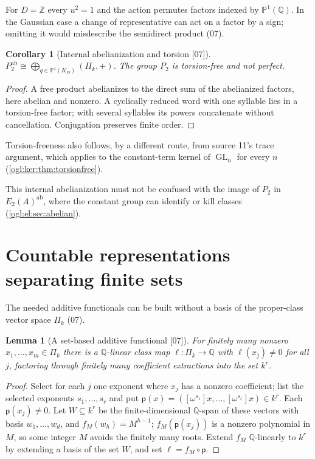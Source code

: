 \documentclass[11pt,oneside]{article}
\numberwithin{equation}{section}
\newtheorem{lemma}[lemma]{Lemma}
\newtheorem{corollary}[corollary]{Corollary}
\theoremstyle{definition}
\theoremstyle{remark}
\newcommand{\Z}{\mathbb Z}
\newcommand{\Q}{\mathbb Q}
\newcommand{\PP}{\mathbb P}
\newcommand{\GL}{\operatorname{GL}}
\newcommand{\ab}{\mathrm{ab}}
\newcommand{\coeff}[2]{[\omega^{#1}]#2}
\newcommand{\src}[1]{\textup{\textsf{\small[#1]}}}
\begin{document}
For $D=\Z$ every $u^2=1$ and the action permutes factors indexed by
$\PP^1(\Q)$. In the Gaussian case a change of representative can act on a
factor by a sign; omitting it would misdescribe the semidirect product (07).

\begin{corollary}[Internal abelianization and torsion \src{07}]\label{ogl:el:cor:kernelab}
$P_2^{\ab}\cong\bigoplus_{q\in\PP^1(K_D)}(\Pi_k,+)$. The group $P_2$ is
torsion-free and not perfect.
\end{corollary}
\begin{proof}
A free product abelianizes to the direct sum of the abelianized factors, here
abelian and nonzero. A cyclically reduced word with one syllable lies in a
torsion-free factor; with several syllables its powers concatenate without
cancellation. Conjugation preserves finite order.
\end{proof}

Torsion-freeness also follows, by a different route, from source 11's trace
argument, which applies to the constant-term kernel of $\GL_n$ for every $n$
(\cref{ogl:ker:thm:torsionfree}).

This internal abelianization must not be confused with the image of $P_2$ in
$E_2(A)^{\ab}$, where the constant group can identify or kill classes
(\cref{ogl:el:sec:abelian}).

\section{Countable representations separating finite sets}\label{ogl:el:sec:countable}

The needed additive functionals can be built without a basis of the
proper-class vector space $\Pi_k$ (07).

\begin{lemma}[A set-based additive functional \src{07}]\label{ogl:el:lem:functional}
For finitely many nonzero $x_1,\dots,x_m\in\Pi_k$ there is a $\Q$-linear class
map $\ell:\Pi_k\to\Q$ with $\ell(x_j)\ne0$ for all $j$, factoring through
finitely many coefficient extractions into the set $k^r$.
\end{lemma}
\begin{proof}
Select for each $j$ one exponent where $x_j$ has a nonzero coefficient; list the
selected exponents $s_1,\dots,s_r$ and put
$\mathsf p(x)=(\coeff{s_1}{x},\dots,\coeff{s_r}{x})\in k^r$. Each $\mathsf p(x_j)\ne0$.
Let $W\subseteq k^r$ be the finite-dimensional $\Q$-span of these vectors with
basis $w_1,\dots,w_d$, and $f_M(w_h)=M^{h-1}$; $f_M(\mathsf p(x_j))$ is a
nonzero polynomial in $M$, so some integer $M$ avoids the finitely many roots.
Extend $f_M$ $\Q$-linearly to $k^r$ by extending a basis of the set $W$, and set
$\ell=f_M\circ\mathsf p$.
\end{proof}
\end{document}
